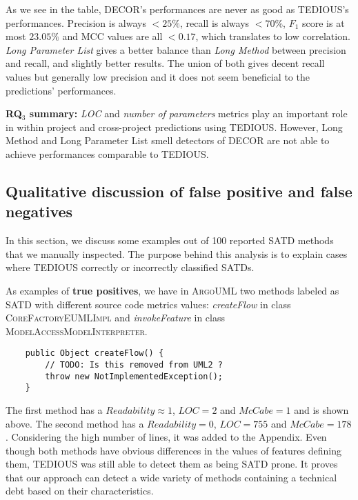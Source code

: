As we see in the table, DECOR's performances are never as good as TEDIOUS's performances. Precision is always $<25\%$, recall is always $<70\%$, $F_1$ score is at most $23.05\%$ and MCC values are all $<0.17$, which translates to low correlation. \textit{Long Parameter List} gives a better balance than \textit{Long Method} between precision and recall, and slightly better results. The union of both gives decent recall values but generally low precision and it does not seem beneficial to the predictions' performances.

\begin{mdframed}
	{\bf RQ$_3$ summary:} \textit{LOC} and \textit{number of parameters} metrics play an important role in within project and cross-project predictions using TEDIOUS. However, Long Method and Long Parameter List smell detectors of DECOR are not able to achieve performances comparable to TEDIOUS.
\end{mdframed}

\subsection{Qualitative discussion of false positive and false negatives}


In this section, we discuss some examples out of 100 reported SATD methods that we manually inspected. The purpose behind this analysis is to explain cases where TEDIOUS correctly or incorrectly classified SATDs.

As examples of \textbf{true positives}, we have in \textsc{ArgoUML} two methods labeled as SATD with different source code metrics values: \textit{createFlow} in class \textsc{CoreFactoryEUMLImpl} and \textit{invokeFeature} in class \textsc{ModelAccessModelInterpreter}. 

\begin{mdframed}
	\begin{lstlisting}
	public Object createFlow() {
		// TODO: Is this removed from UML2 ?
		throw new NotImplementedException();
	}
	\end{lstlisting}
\end{mdframed}

The first method has a $Readability\approx1$, $LOC=2$ and $McCabe=1$ and is shown above. The second method has a $Readability=0$, $LOC=755$ and $McCabe=178$. Considering the high number of lines, it was added to the Appendix. Even though both methods have obvious differences in the values of features defining them, TEDIOUS was still able to detect them as being SATD prone. It proves that our approach can detect a wide variety of methods containing a technical debt based on their characteristics.

